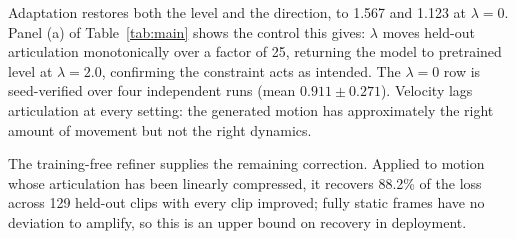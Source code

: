 \documentclass{article}
\begin{document}
Adaptation restores both the level and the direction, to 1.567 and 1.123 at
$\lambda = 0$. Panel (a) of Table~\ref{tab:main} shows the control this gives:
$\lambda$ moves held-out articulation monotonically over a factor of 25, returning
the model to pretrained level at $\lambda = 2.0$, confirming the constraint acts
as intended. The $\lambda = 0$ row is seed-verified over four independent runs
(mean $0.911 \pm 0.271$). Velocity lags articulation at every setting: the
generated motion has approximately the right amount of movement but not the right
dynamics.

The training-free refiner supplies the remaining correction. Applied to motion
whose articulation has been linearly compressed, it recovers 88.2\% of the loss
across 129 held-out clips with every clip improved; fully static frames have no
deviation to amplify, so this is an upper bound on recovery in deployment.
\end{document}

